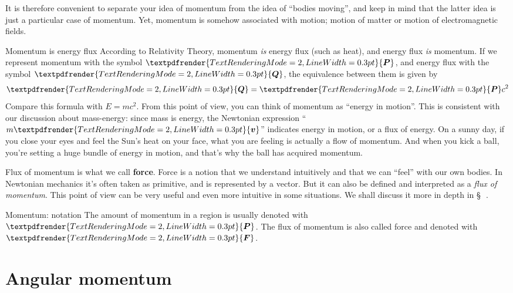 \documentclass[a4paper,12pt,%
onecolumn,oneside,titlepage,%
british%
]{memoir}
\renewcommand*{\bm}[1]{\textpdfrender{TextRenderingMode=2,LineWidth=0.3pt}{\boldsymbol{#1}}}
\newcommand{\mynotew}[1]{{\footnotesize\color{midgrey}\faIcon{tools}\ #1}}
\renewcommand*{\|}[1][]{\nonscript\:#1\vert\nonscript\:\mathopen{}}
\newcommand*{\sect}{\S}%
\newcommand*{\yP}{\bm{P}}
\newcommand*{\yF}{\bm{F}}
\newcommand*{\masse}{mass-energy}
\begin{document}
It is therefore convenient to separate your idea of momentum from the idea of \enquote{bodies moving}, and keep in mind that the latter idea is just a particular case of momentum. Yet, momentum is somehow associated with motion; motion of matter or motion of electromagnetic fields. %

\begin{extra}{Momentum is energy flux}
  According to Relativity Theory, momentum \emph{is} energy flux (such as heat), and energy flux \emph{is} momentum. If we represent momentum with the symbol $\bm{P}$, and energy flux with the symbol $\bm{Q}$, the equivalence between them is given by
  \begin{equation}
    \label{eq:momentum_heat}
    \bm{Q} = \bm{P}c^{2}
  \end{equation}
  Compare this formula with $E=mc^{2}$. From this point of view, you can think of momentum as \enquote{energy in motion}. This is consistent with our discussion about \masse: since mass is energy, the Newtonian expression \enquote{$m\bm{v}$} indicates energy in motion, or a flux of energy. On a sunny day, if you close your eyes and feel the Sun's heat on your face, what you are feeling is actually a flow of momentum. And when you kick a ball, you're setting a huge bundle of energy in motion, and that's why the ball has acquired momentum.
\end{extra}
\medskip

Flux of momentum is what we call \textbf{force}. Force is a notion that we understand intuitively and that we can \enquote{feel} with our own bodies. In Newtonian mechanics it's often taken as primitive, and is represented by a vector. But it can also be defined and interpreted as a \emph{flux of momentum}. This point of view can be very useful and even more intuitive in some situations. We shall discuss it more in depth in \sect\,\mynotew{}.

\begin{definition}{Momentum: notation}
  The amount of momentum in a region is usually denoted with $\yP$. The flux of momentum is also called force and denoted with $\yF$.
\end{definition}




\section{Angular momentum}
\label{sec:intro_angmomentum}
\end{document}
